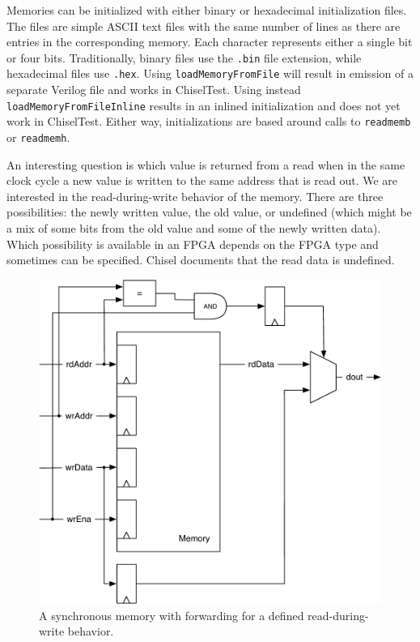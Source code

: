 \documentclass[%
    10pt,
    headinclude, footexclude,
    openright, %
    notitlepage,
    cleardoubleempty,
    headsepline,
    pointlessnumbers,
    bibtotoc, idxtotoc,
    ]{scrbook}
\newcommand{\code}[1]{{\small{\texttt{#1}}}}
\newcommand{\scale}{0.7}
\begin{document}

Memories can be initialized with either binary or hexadecimal initialization files. 
The files are simple ASCII text files with the same number of lines as there are 
entries in the corresponding memory. Each character represents either a single bit 
or four bits. Traditionally, binary files use the \code{.bin} file extension, while 
hexadecimal files use \code{.hex}. Using \code{loadMemoryFromFile} will result in 
emission of a separate Verilog file and works in ChiselTest. Using instead 
\code{loadMemoryFromFileInline} results in an inlined initialization and does not 
yet work in ChiselTest. Either way, initializations are based around calls to 
\code{readmemb} or \code{readmemh}.

An interesting question is which value is returned from a read when in the same clock
cycle a new value is written to the same address that is read out.
We are interested in the read-during-write behavior of the memory.
There are three possibilities: the newly written value, the old value, or undefined
(which might be a mix of some bits from the old value and some of the newly written data).
Which possibility is available in an FPGA depends on the FPGA type and
sometimes can be specified.
Chisel documents that the read data is undefined.

\begin{figure}
  \centering
  \includegraphics[scale=\scale]{figures/memory-forwarding}
  \caption{A synchronous memory with forwarding for a defined read-during-write behavior.}
  \label{fig:memory:forwarding}
\end{figure}
\end{document}
